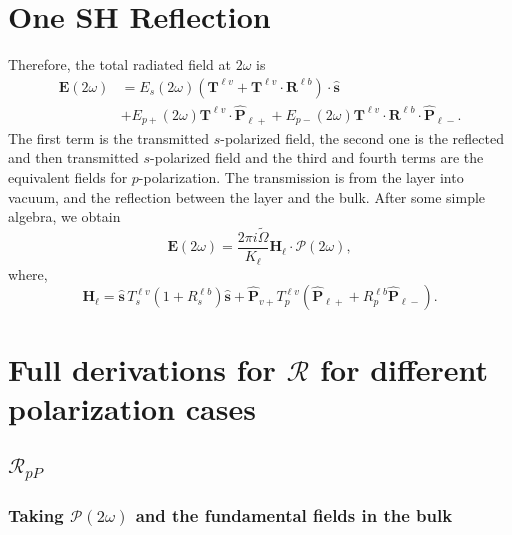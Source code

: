 \section{One SH Reflection}
Therefore, the total radiated field at 
$2\omega$ is 
\begin{equation}\label{r7}
\begin{split}
\mathbf{E}(2\omega)  
&= E_s(2\omega)  
\left(
\mathbf{T}^{\ell v} + \mathbf{T}^{\ell v}\cdot\mathbf{R}^{\ell b}
\right)  
\cdot\hat{\mathbf{s}}\nonumber\\
&+ E_{p+}(2\omega)\mathbf{T}^{\ell v}\cdot\hat{\mathbf{P}}_{\ell +}
 + E_{p-}(2\omega)\mathbf{T}^{\ell v}
\cdot\mathbf{R}^{\ell b}\cdot\hat{\mathbf{P}}_{\ell-}.  
\end{split}
\end{equation} 
The first term is  the transmitted $s$-polarized field, the second one is the 
reflected and then transmitted $s$-polarized field and the third and fourth 
terms are the equivalent fields for $p$-polarization. The transmission is from 
the layer into vacuum, and the reflection between the layer and the bulk. After 
some simple algebra, we obtain 
\begin{equation}\label{r8}
\mathbf{E}(2\omega) = \frac{2\pi i\tilde{\Omega}}{K_{\ell}}
\mathbf{H}_{\ell}\cdot\boldsymbol{\mathcal{P}}(2\omega),
\end{equation} 
where,
\begin{equation}\label{r9}
\mathbf{H}_{\ell}
= \hat{\mathbf{s}}\,T_s^{\ell v}\left(1+R_s^{\ell b}\right)\hat{\mathbf{s}}
+ \hat{\mathbf{P}}_{v+}T_{p}^{\ell v}
\left(
\hat{\mathbf{P}}_{\ell +} +R_{p}^{\ell b}\hat{\mathbf{P}}_{\ell -}
\right). 
\end{equation}


\section{Full derivations for \texorpdfstring{$\mathcal{R}$}{R} for different
polarization cases}

\subsection{\texorpdfstring{$\mathcal{R}_{pP}$}{RpP}}


\subsubsection{Taking \texorpdfstring{$\mathcal{P}(2\omega)$}{P(2w)} and the
fundamental fields in the bulk}

